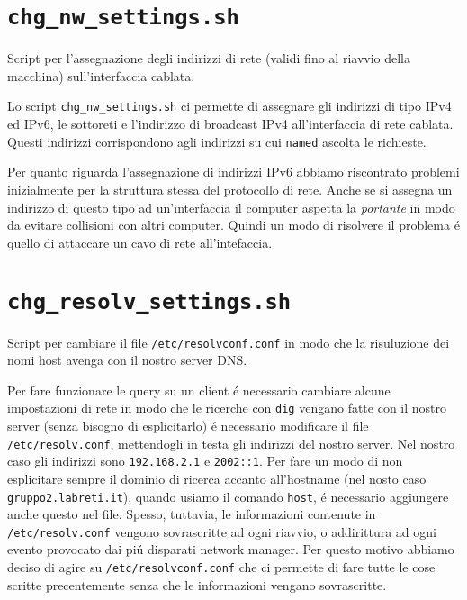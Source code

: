 \documentclass[9pt, a4paper, oneside]{article}
\begin{document}
		\section{\texttt{chg\_nw\_settings.sh}}
			\par
				Script per l'assegnazione degli indirizzi di 
				rete (validi fino al riavvio della macchina) 
				sull'interfaccia cablata.
			\par
				Lo script \texttt{chg\_nw\_settings.sh} ci 
				permette di assegnare gli indirizzi di tipo 
				IPv4 ed IPv6, le sottoreti e l'indirizzo di 
				broadcast IPv4 all'interfaccia di rete 
				cablata. Questi indirizzi corrispondono agli 
				indirizzi su cui \texttt{named} ascolta le 
				richieste.
			\par
				Per quanto riguarda l'assegnazione di indirizzi 
				IPv6 abbiamo riscontrato problemi inizialmente 
				per la struttura stessa del protocollo di rete. 
				Anche se si assegna un indirizzo di questo 
				tipo ad un'interfaccia il computer aspetta la 
				\emph{portante} in modo da evitare collisioni 
				con altri computer. Quindi un modo di risolvere 
				il problema \'e quello di attaccare un cavo di 
				rete all'intefaccia.
			\texttt{}
			\newpage
		\section{\texttt{chg\_resolv\_settings.sh}}
			\par
				Script per cambiare il file 
				\texttt{/etc/resolvconf.conf} in modo che 
				la risuluzione dei nomi host avenga con il 
				nostro server DNS.
			\par
				Per fare funzionare le query su un client \'e 
				necessario cambiare alcune impostazioni di 
				rete in modo che le ricerche con 
				\texttt{dig} vengano fatte con il nostro 
				server (senza bisogno di esplicitarlo) \'e 
				necessario modificare il file 
				\texttt{/etc/resolv.conf}, mettendogli in 
				testa gli indirizzi del nostro server. Nel 
				nostro caso gli indirizzi sono 
				\texttt{192.168.2.1} e \texttt{2002::1}. 
				Per fare un modo di non esplicitare sempre il 
				dominio di ricerca accanto all'hostname (nel 
				nosto caso \texttt{gruppo2.labreti.it}), quando 
				usiamo il comando \texttt{host}, \'e necessario 
				aggiungere anche questo nel file. Spesso, 
				tuttavia, le informazioni contenute in 
				\texttt{/etc/resolv.conf} vengono sovrascritte 
				ad ogni riavvio, o addirittura ad ogni evento 
				provocato dai pi\'u disparati network manager. 
				Per questo motivo abbiamo deciso di agire su 
				\texttt{/etc/resolvconf.conf} che ci permette 
				di fare tutte le cose scritte precentemente  
				senza che le informazioni vengano sovrascritte. 
			\texttt{}
			\newpage
\end{document}
